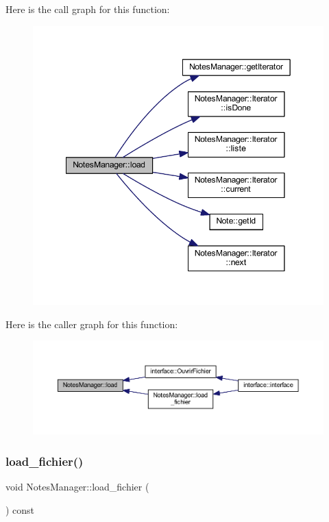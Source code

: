Here is the call graph for this function\+:
\nopagebreak
\begin{figure}[H]
\begin{center}
\leavevmode
\includegraphics[width=349pt]{class_notes_manager_ad4fb2de50633dd25b71024343341cd64_cgraph}
\end{center}
\end{figure}
Here is the caller graph for this function\+:
\nopagebreak
\begin{figure}[H]
\begin{center}
\leavevmode
\includegraphics[width=350pt]{class_notes_manager_ad4fb2de50633dd25b71024343341cd64_icgraph}
\end{center}
\end{figure}
\mbox{\label{class_notes_manager_a716744a0992b0ce74d43d80c7d987531}} 
\subsubsection{\texorpdfstring{load\+\_\+fichier()}{load\_fichier()}}
{\footnotesize\ttfamily void Notes\+Manager\+::load\+\_\+fichier (\begin{DoxyParamCaption}{ }\end{DoxyParamCaption}) const}



